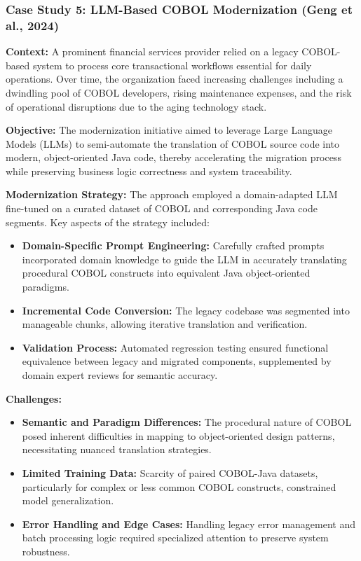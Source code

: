 \documentclass[12pt]{article}
\begin{document}
\subsubsection{Case Study 5: LLM-Based COBOL Modernization (Geng et al., 2024)}

\textbf{Context:}  
A prominent financial services provider relied on a legacy COBOL-based system to process core transactional workflows essential for daily operations. Over time, the organization faced increasing challenges including a dwindling pool of COBOL developers, rising maintenance expenses, and the risk of operational disruptions due to the aging technology stack.

\textbf{Objective:}  
The modernization initiative aimed to leverage Large Language Models (LLMs) to semi-automate the translation of COBOL source code into modern, object-oriented Java code, thereby accelerating the migration process while preserving business logic correctness and system traceability.

\textbf{Modernization Strategy:}  
The approach employed a domain-adapted LLM fine-tuned on a curated dataset of COBOL and corresponding Java code segments. Key aspects of the strategy included:

\begin{itemize}
    \item \textbf{Domain-Specific Prompt Engineering:} Carefully crafted prompts incorporated domain knowledge to guide the LLM in accurately translating procedural COBOL constructs into equivalent Java object-oriented paradigms.
    \item \textbf{Incremental Code Conversion:} The legacy codebase was segmented into manageable chunks, allowing iterative translation and verification.
    \item \textbf{Validation Process:} Automated regression testing ensured functional equivalence between legacy and migrated components, supplemented by domain expert reviews for semantic accuracy.
\end{itemize}

\textbf{Challenges:}  
\begin{itemize}
    \item \textbf{Semantic and Paradigm Differences:} The procedural nature of COBOL posed inherent difficulties in mapping to object-oriented design patterns, necessitating nuanced translation strategies.
    \item \textbf{Limited Training Data:} Scarcity of paired COBOL-Java datasets, particularly for complex or less common COBOL constructs, constrained model generalization.
    \item \textbf{Error Handling and Edge Cases:} Handling legacy error management and batch processing logic required specialized attention to preserve system robustness.
\end{itemize}
\end{document}
